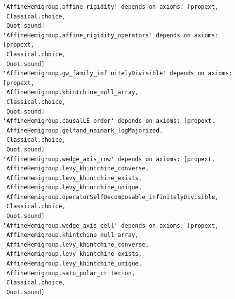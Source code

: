 \begin{verbatim}
'AffineHemigroup.affine_rigidity' depends on axioms: [propext,
 Classical.choice,
 Quot.sound]
'AffineHemigroup.affine_rigidity_operators' depends on axioms: [propext,
 Classical.choice,
 Quot.sound]
'AffineHemigroup.gw_family_infinitelyDivisible' depends on axioms: [propext,
 AffineHemigroup.khintchine_null_array,
 Classical.choice,
 Quot.sound]
'AffineHemigroup.causalLE_order' depends on axioms: [propext,
 AffineHemigroup.gelfand_naimark_logMajorized,
 Classical.choice,
 Quot.sound]
'AffineHemigroup.wedge_axis_row' depends on axioms: [propext,
 AffineHemigroup.levy_khintchine_converse,
 AffineHemigroup.levy_khintchine_exists,
 AffineHemigroup.levy_khintchine_unique,
 AffineHemigroup.operatorSelfDecomposable_infinitelyDivisible,
 Classical.choice,
 Quot.sound]
'AffineHemigroup.wedge_axis_cell' depends on axioms: [propext,
 AffineHemigroup.khintchine_null_array,
 AffineHemigroup.levy_khintchine_converse,
 AffineHemigroup.levy_khintchine_exists,
 AffineHemigroup.levy_khintchine_unique,
 AffineHemigroup.sato_polar_criterion,
 Classical.choice,
 Quot.sound]
\end{verbatim}

